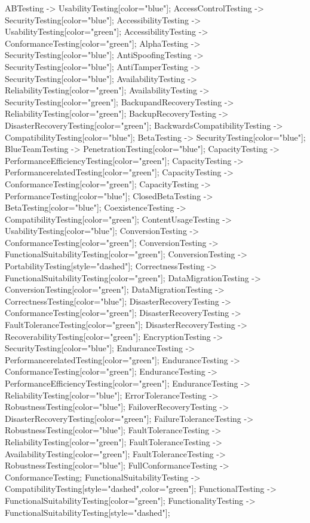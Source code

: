 \documentclass{article}
\begin{document}
{ABTesting -> UsabilityTesting[color="blue"];
AccessControlTesting -> SecurityTesting[color="blue"];
AccessibilityTesting -> UsabilityTesting[color="green"];
AccessibilityTesting -> ConformanceTesting[color="green"];
AlphaTesting -> SecurityTesting[color="blue"];
AntiSpoofingTesting -> SecurityTesting[color="blue"];
AntiTamperTesting -> SecurityTesting[color="blue"];
AvailabilityTesting -> ReliabilityTesting[color="green"];
AvailabilityTesting -> SecurityTesting[color="green"];
BackupandRecoveryTesting -> ReliabilityTesting[color="green"];
BackupRecoveryTesting -> DisasterRecoveryTesting[color="green"];
BackwardsCompatibilityTesting -> CompatibilityTesting[color="blue"];
BetaTesting -> SecurityTesting[color="blue"];
BlueTeamTesting -> PenetrationTesting[color="blue"];
CapacityTesting -> PerformanceEfficiencyTesting[color="green"];
CapacityTesting -> PerformancerelatedTesting[color="green"];
CapacityTesting -> ConformanceTesting[color="green"];
CapacityTesting -> PerformanceTesting[color="blue"];
ClosedBetaTesting -> BetaTesting[color="blue"];
CoexistenceTesting -> CompatibilityTesting[color="green"];
ContentUsageTesting -> UsabilityTesting[color="blue"];
ConversionTesting -> ConformanceTesting[color="green"];
ConversionTesting -> FunctionalSuitabilityTesting[color="green"];
ConversionTesting -> PortabilityTesting[style="dashed"];
CorrectnessTesting -> FunctionalSuitabilityTesting[color="green"];
DataMigrationTesting -> ConversionTesting[color="green"];
DataMigrationTesting -> CorrectnessTesting[color="blue"];
DisasterRecoveryTesting -> ConformanceTesting[color="green"];
DisasterRecoveryTesting -> FaultToleranceTesting[color="green"];
DisasterRecoveryTesting -> RecoverabilityTesting[color="green"];
EncryptionTesting -> SecurityTesting[color="blue"];
EnduranceTesting -> PerformancerelatedTesting[color="green"];
EnduranceTesting -> ConformanceTesting[color="green"];
EnduranceTesting -> PerformanceEfficiencyTesting[color="green"];
EnduranceTesting -> ReliabilityTesting[color="blue"];
ErrorToleranceTesting -> RobustnessTesting[color="blue"];
FailoverRecoveryTesting -> DisasterRecoveryTesting[color="green"];
FailureToleranceTesting -> RobustnessTesting[color="blue"];
FaultToleranceTesting -> ReliabilityTesting[color="green"];
FaultToleranceTesting -> AvailabilityTesting[color="green"];
FaultToleranceTesting -> RobustnessTesting[color="blue"];
FullConformanceTesting -> ConformanceTesting;
FunctionalSuitabilityTesting -> CompatibilityTesting[style="dashed",color="green"];
FunctionalTesting -> FunctionalSuitabilityTesting[color="green"];
FunctionalityTesting -> FunctionalSuitabilityTesting[style="dashed"];
}
\end{document}
